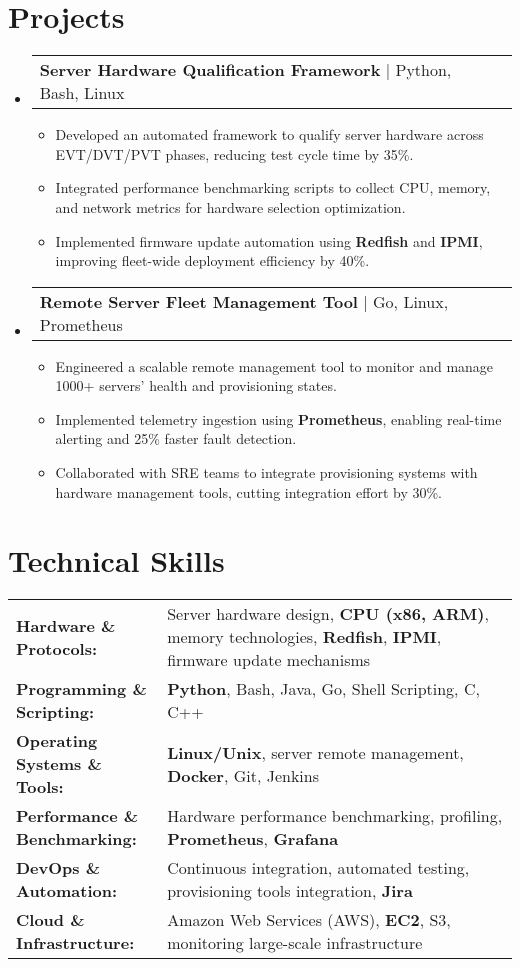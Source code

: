 \documentclass[letterpaper,11pt]{article}
\makeatletter
\newcommand{\resumeItem}[1]{
  \item\footnotesize{
    {#1 \vspace{-2pt}}
  }
}
\newcommand{\resumeProjectHeading}[2]{
    \item
    \begin{tabular*}{1.001\textwidth}{l@{\extracolsep{\fill}}r}
      \small#1 & \textbf{\small #2}\\
    \end{tabular*}\vspace{-7pt}
}
\newcommand{\resumeSubHeadingListStart}{\begin{itemize}[leftmargin=0pt, label={}]}
\newcommand{\resumeSubHeadingListEnd}{\end{itemize}}
\newcommand{\resumeItemListStart}{\begin{itemize}[leftmargin=*]}
\newcommand{\resumeItemListEnd}{\end{itemize}\vspace{-5pt}}
\makeatother
\begin{document}
\section{Projects}
    \vspace{-5pt}
    \resumeSubHeadingListStart
      \resumeProjectHeading
          {\textbf{Server Hardware Qualification Framework} | Python, Bash, Linux}{}
          \resumeItemListStart
              \resumeItem{Developed an automated framework to qualify server hardware across EVT/DVT/PVT phases, reducing test cycle time by 35\%.}
              \resumeItem{Integrated performance benchmarking scripts to collect CPU, memory, and network metrics for hardware selection optimization.}
              \resumeItem{Implemented firmware update automation using \textbf{Redfish} and \textbf{IPMI}, improving fleet-wide deployment efficiency by 40\%.}
          \resumeItemListEnd
          \vspace{-16pt}
      \resumeProjectHeading
          {\textbf{Remote Server Fleet Management Tool} | Go, Linux, Prometheus}{}
          \resumeItemListStart
              \resumeItem{Engineered a scalable remote management tool to monitor and manage 1000+ servers’ health and provisioning states.}
              \resumeItem{Implemented telemetry ingestion using \textbf{Prometheus}, enabling real-time alerting and 25\% faster fault detection.}
              \resumeItem{Collaborated with SRE teams to integrate provisioning systems with hardware management tools, cutting integration effort by 30\%.}
          \resumeItemListEnd
    \resumeSubHeadingListEnd
\vspace{-10pt}
\section{Technical Skills}
        \vspace{-14pt}
        \begin{table}[h]
            \footnotesize
            \begin{tabular}{p{0.3\linewidth} p{0.7\linewidth}}
                \textbf{Hardware \& Protocols:} & Server hardware design, \textbf{CPU (x86, ARM)}, memory technologies, \textbf{Redfish}, \textbf{IPMI}, firmware update mechanisms \\
                \textbf{Programming \& Scripting:} & \textbf{Python}, Bash, Java, Go, Shell Scripting, C, C++ \\
                \textbf{Operating Systems \& Tools:} & \textbf{Linux/Unix}, server remote management, \textbf{Docker}, Git, Jenkins \\
                \textbf{Performance \& Benchmarking:} & Hardware performance benchmarking, profiling, \textbf{Prometheus}, \textbf{Grafana} \\
                \textbf{DevOps \& Automation:} & Continuous integration, automated testing, provisioning tools integration, \textbf{Jira} \\
                \textbf{Cloud \& Infrastructure:} & Amazon Web Services (AWS), \textbf{EC2}, S3, monitoring large-scale infrastructure \\
            \end{tabular}
        \end{table}
\end{document}
